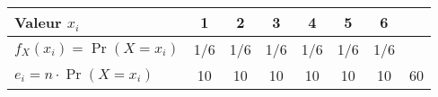 \documentclass{standalone}
\begin{document}
\begin{tabular}{l|c|c|c|c |c|c|c}
	Valeur $x_i$ & 1 & 2 & 3 & 4 & 5 & 6 & \\ \hline
	$f_X(x_i) = \Pr(X=x_i)$ & 1/6 & 1/6 & 1/6 & 1/6 & 1/6 & 1/6&\\
	\hline $e_i = n\cdot \Pr(X=x_i)$ & 10 & 10 & 10 & 10 & 10 & 10 & 60
\end{tabular}
\end{document}
